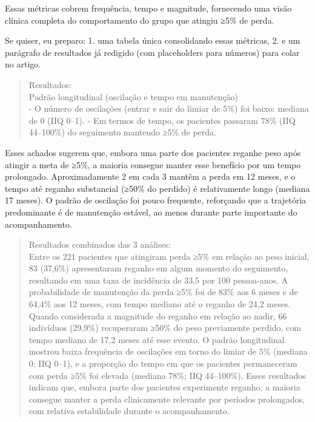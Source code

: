 \documentclass[
]{article}
\begin{document}
Essas métricas cobrem frequência, tempo e magnitude, fornecendo uma
visão clínica completa do comportamento do grupo que atingiu ≥5\% de
perda.

Se quiser, eu preparo: 1. uma tabela única consolidando essas métricas,
2. e um parágrafo de resultados já redigido (com placeholders para
números) para colar no artigo.

\begin{quote}
Resultados:\\
Padrão longitudinal (oscilação e tempo em manutenção)\\
- O número de oscilações (entrar e sair do limiar de 5\%) foi baixo:
mediana de 0 (IIQ 0--1). - Em termos de tempo, os pacientes passaram
78\% (IIQ 44--100\%) do seguimento mantendo ≥5\% de perda.
\end{quote}

Esses achados sugerem que, embora uma parte dos pacientes reganhe peso
após atingir a meta de ≥5\%, a maioria consegue manter esse benefício
por um tempo prolongado. Aproximadamente 2 em cada 3 mantêm a perda em
12 meses, e o tempo até reganho substancial (≥50\% do perdido) é
relativamente longo (mediana 17 meses). O padrão de oscilação foi pouco
frequente, reforçando que a trajetória predominante é de manutenção
estável, ao menos durante parte importante do acompanhamento.

\begin{quote}
Resultados combinados das 3 análises:\\
Entre os 221 pacientes que atingiram perda ≥5\% em relação ao peso
inicial, 83 (37,6\%) apresentaram reganho em algum momento do
seguimento, resultando em uma taxa de incidência de 33,5 por 100
pessoa-anos. A probabilidade de manutenção da perda ≥5\% foi de 83\% aos
6 meses e de 64,4\% aos 12 meses, com tempo mediano até o reganho de
24,2 meses. Quando considerada a magnitude do reganho em relação ao
nadir, 66 indivíduos (29,9\%) recuperaram ≥50\% do peso previamente
perdido, com tempo mediano de 17,2 meses até esse evento. O padrão
longitudinal mostrou baixa frequência de oscilações em torno do limiar
de 5\% (mediana 0; IIQ 0--1), e a proporção do tempo em que os pacientes
permaneceram com perda ≥5\% foi elevada (mediana 78\%; IIQ 44--100\%).
Esses resultados indicam que, embora parte dos pacientes experimente
reganho, a maioria consegue manter a perda clinicamente relevante por
períodos prolongados, com relativa estabilidade durante o
acompanhamento.\\
\end{quote}
\end{document}
